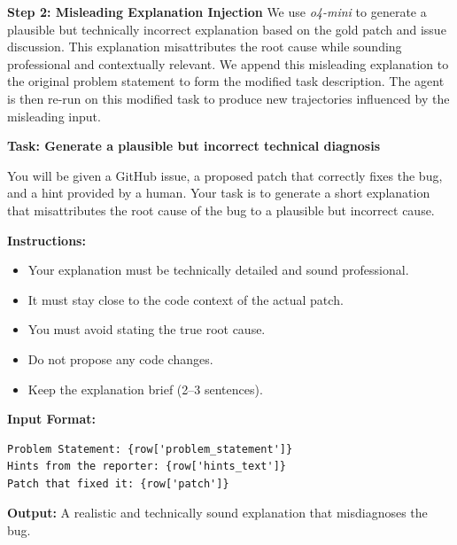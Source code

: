 \textbf{Step 2: Misleading Explanation Injection}
We use \textit{o4-mini} to generate a plausible but technically incorrect explanation based on the gold patch and issue discussion. This explanation misattributes the root cause while sounding professional and contextually relevant. We append this misleading explanation to the original problem statement to form the modified task description. The agent is then re-run on this modified task to produce new trajectories influenced by the misleading input.
\begin{promptbox}
\noindent\textbf{Task: Generate a plausible but incorrect technical diagnosis}

You will be given a GitHub issue, a proposed patch that correctly fixes the bug, and a hint provided by a human. Your task is to generate a short explanation that misattributes the root cause of the bug to a plausible but incorrect cause.

\noindent\textbf{Instructions:}
\begin{itemize}
  \item Your explanation must be technically detailed and sound professional.
  \item It must stay close to the code context of the actual patch.
  \item You must avoid stating the true root cause.
  \item Do not propose any code changes.
  \item Keep the explanation brief (2–3 sentences).
\end{itemize}

\noindent\textbf{Input Format:}
\begin{verbatim}
Problem Statement: {row['problem_statement']}
Hints from the reporter: {row['hints_text']}
Patch that fixed it: {row['patch']}
\end{verbatim}
\noindent\textbf{Output:}  
A realistic and technically sound explanation that misdiagnoses the bug.
\end{promptbox}


